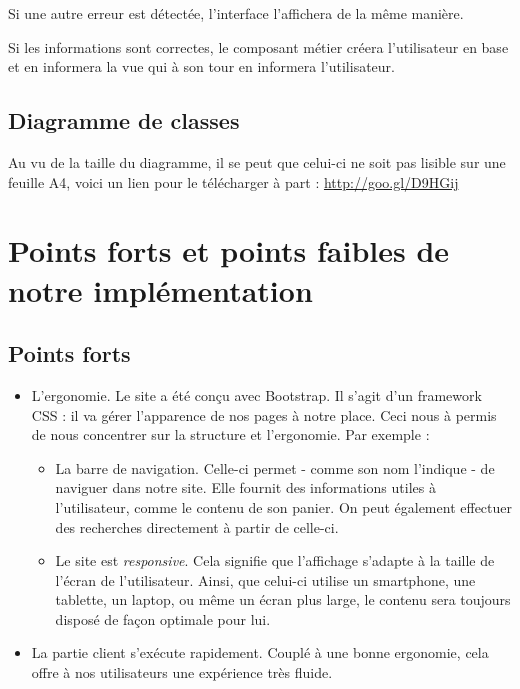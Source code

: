 	Si une autre erreur est détectée, l'interface l'affichera de la même manière.

	Si les informations sont correctes, le composant métier créera l'utilisateur en base et en informera la vue qui à son tour en informera l'utilisateur.

	\clearpage
	\subsection{Diagramme de classes}
	Au vu de la taille du diagramme, il se peut que celui-ci ne soit pas lisible sur une feuille A4, voici un lien pour le télécharger à part : \href{http://goo.gl/D9HGij}{http://goo.gl/D9HGij}

\section{Points forts et points faibles de notre implémentation}

	\subsection{Points forts}
	\begin{itemize}

		\item L'ergonomie. Le site a été conçu avec Bootstrap. Il s'agit d'un framework CSS : il va gérer l'apparence de nos pages à notre place. Ceci nous à permis de nous concentrer sur la structure et l'ergonomie. Par exemple :

		\begin{itemize}
			\item La barre de navigation. Celle-ci permet - comme son nom l'indique - de naviguer dans notre site. Elle fournit des informations utiles à l'utilisateur, comme le contenu de son panier. On peut également effectuer des recherches directement à partir de celle-ci.

			\item Le site est \emph{responsive}. Cela signifie que l'affichage s'adapte à la taille de l'écran de l'utilisateur. Ainsi, que celui-ci utilise un smartphone, une tablette, un laptop, ou même un écran plus large, le contenu sera toujours disposé de façon optimale pour lui.
		\end{itemize}

		\item La partie client s'exécute rapidement. Couplé à une bonne ergonomie, cela offre à nos utilisateurs une expérience très fluide.

	\end{itemize}


